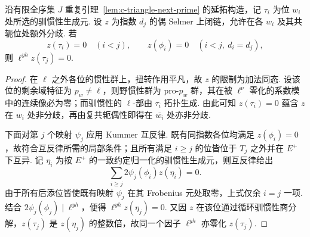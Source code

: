 \begin{lemma}[先前条件下的单项驯惯性零化]
\label{lem:c-triangle-tame}
\emitthmsource
沿有限全序集 $J$ 重复引理~\ref{lem:c-triangle-next-prime} 的延拓构造，记 $\tau_i$ 为位 $w_i$ 处所选的驯惯性生成元. 设 $z$ 为指数 $d_j$ 的偶 Selmer 上闭链，允许在各 $w_i$ 及其共轭位处额外分歧. 若
\[
 z(\tau_i)=0\quad(i<j),\qquad
 z(\phi_i)=0\quad(i<j,\ d_i=d_j),
\]
则 $\ell^{yh}z(\tau_j)=0$.
\end{lemma}
\begin{proof}
在 $\ell$ 之外各位的惯性群上，扭转作用平凡，故 $z$ 的限制为加法同态. 设该位的剩余域特征为 $p_w\ne\ell$，则野惯性群为 pro-$p_w$ 群，其在被 $\ell^\nu$ 零化的系数模中的连续像必为零；而驯惯性的 $\ell$-部由 $\tau_i$ 拓扑生成. 由此可知 $z(\tau_i)=0$ 蕴含 $z$ 在 $w_i$ 处非分歧，再由复共轭偶性即得在 $\overline{w_i}$ 处亦非分歧.

下面对第 $j$ 个映射 $\psi_j$ 应用 Kummer 互反律. 既有同指数各位均满足 $z(\phi_i)=0$，故符合互反律所需的局部条件；且所有满足 $i\ge j$ 的位皆位于 $T_j$ 之外并在 $E^+$ 下互异. 记 $\eta_i$ 为按 $E^+$ 的一致约定归一化的驯惯性生成元，则互反律给出
\[
 \sum_{i\ge j}2\psi_j(\phi_i)z(\eta_i)=0.
\]
由于所有后添位皆使既有映射 $\psi_j$ 在其 Frobenius 元处取零，上式仅余 $i=j$ 一项. 结合 $2\psi_j(\phi_j)\mid\ell^{yh}$，便得 $\ell^{yh}z(\eta_j)=0$. 又因 $z$ 在该位通过循环驯惯性商分解，$z(\tau_j)$ 是 $z(\eta_j)$ 的整数倍，故同一个因子 $\ell^{yh}$ 亦零化 $z(\tau_j)$.
\end{proof}

